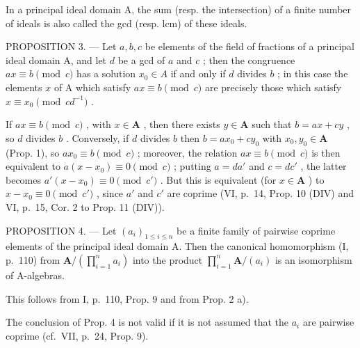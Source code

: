 In a principal ideal domain A, the sum (resp. the intersection) of a finite number of ideals is also called the gcd (resp. lcm) of these ideals.

PROPOSITION 3. --- Let \(a, b, c\) be elements of the field of fractions of a principal ideal domain A, and let \(d\) be a gcd of \(a\) and \(c\) ; then the congruence \(ax \equiv b \pmod{c}\) has a solution \(x_0 \in A\) if and only if \(d\) divides \(b\) ; in this case the elements \(x\) of A which satisfy \(ax \equiv b \pmod{c}\) are precisely those which satisfy \(x \equiv x_0 \pmod{cd^{-1}}\) .

If \(ax \equiv b \pmod{c}\) , with \(x \in \mathbf{A}\) , then there exists \(y \in \mathbf{A}\) such that \(b = ax + cy\) , so \(d\) divides \(b\) . Conversely, if \(d\) divides \(b\) then \(b = ax_0 + cy_0\) with \(x_0, y_0 \in \mathbf{A}\) (Prop. 1), so \(ax_0 \equiv b \pmod{c}\) ; moreover, the relation \(ax \equiv b \pmod{c}\) is then equivalent to \(a(x - x_0) \equiv 0 \pmod{c}\) ; putting \(a = da'\) and \(c = dc'\) , the latter becomes \(a'(x - x_0) \equiv 0 \pmod{c'}\) . But this is equivalent (for \(x \in \mathbf{A}\) ) to \(x - x_0 \equiv 0 \pmod{c'}\) , since \(a'\) and \(c'\) are coprime (VI, p.~14, Prop. 10 (DIV) and VI, p.~15, Cor. 2 to Prop. 11 (DIV)).

PROPOSITION 4. --- Let \((a_i)_{1 \leq i \leq n}\) be a finite family of pairwise coprime elements of the principal ideal domain A. Then the canonical homomorphism (I, p.~110) from \(\mathbf{A}/\left(\prod_{i=1}^{n} a_i\right)\) into the product \(\prod_{i=1}^{n} \mathbf{A}/(a_i)\) is an isomorphism of A-algebras.

This follows from I, p.~110, Prop. 9 and from Prop. 2 a).

The conclusion of Prop. 4 is not valid if it is not assumed that the \(a_{i}\) are pairwise coprime (cf.~VII, p.~24, Prop. 9).

